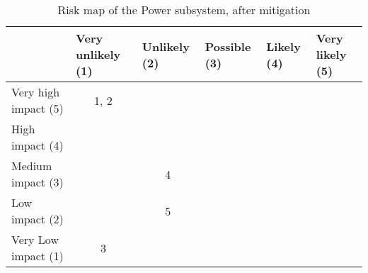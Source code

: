 \begin{table}[H]
\centering
\caption{Risk map of the Power subsystem, after mitigation}
\label{tab:risk-map-power-mitig}\begin{tabular}{l|c|c|c|c|c|}
\cline{2-6}
& \multicolumn{1}{l|}{Very unlikely (1)} & \multicolumn{1}{l|}{Unlikely (2)} & \multicolumn{1}{l|}{Possible (3)} & \multicolumn{1}{l|}{Likely (4)} & \multicolumn{1}{l|}{Very likely (5)} \\ \hline
\multicolumn{1}{|l|}{Very high impact (5)} & \cellcolor{rm-3}1, 2 & \cellcolor{rm-3} & \cellcolor{rm-3} & \cellcolor{rm-3} & \cellcolor{rm-3}\\ \hline 
\multicolumn{1}{|l|}{High impact (4)} & \cellcolor{rm-2} & \cellcolor{rm-2} & \cellcolor{rm-2} & \cellcolor{rm-3} & \cellcolor{rm-3}\\ \hline 
\multicolumn{1}{|l|}{Medium impact (3)} & \cellcolor{rm-0} & \cellcolor{rm-1}4 & \cellcolor{rm-1} & \cellcolor{rm-2} & \cellcolor{rm-3}\\ \hline 
\multicolumn{1}{|l|}{Low impact (2)} & \cellcolor{rm-0} & \cellcolor{rm-0}5 & \cellcolor{rm-1} & \cellcolor{rm-2} & \cellcolor{rm-3}\\ \hline 
\multicolumn{1}{|l|}{Very Low impact (1)} & \cellcolor{rm-0}3 & \cellcolor{rm-0} & \cellcolor{rm-0} & \cellcolor{rm-2} & \cellcolor{rm-3}\\ \hline 
\end{tabular} 
\end{table}

